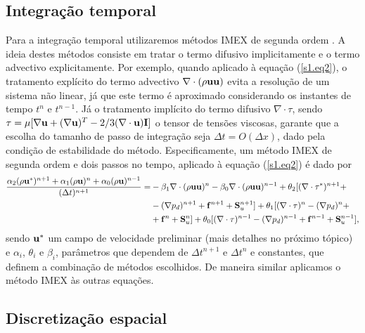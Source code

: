 \documentclass[12pt, brazil]{article}
\begin{document}
\subsection{Integração temporal}

Para a integração temporal utilizaremos métodos IMEX de segunda ordem \cite{ALV13,ASC95,CAL12,HUA19}. A ideia destes métodos consiste em tratar o termo difusivo implicitamente e o termo advectivo explicitamente. Por exemplo, quando aplicado à equação (\ref{s1.eq2}), o tratamento explícito do termo advectivo $\nabla\cdot(\rho {\bf u}{\bf u})$ evita a resolução de um sistema não linear, já que este termo é aproximado considerando os instantes de tempo $t^n$ e $t^{n-1}$. Já o tratamento implícito do termo difusivo $\nabla\cdot\tau$, sendo $\tau = \mu[\nabla{\bf u} + (\nabla{\bf u})^T - 2/3(\nabla\cdot{\bf u}){\bf I}]$ o tensor de tensões viscosas, garante que a escolha do tamanho de passo de integração seja $\Delta t = O(\Delta x)$, dado pela condição de estabilidade do método. Especificamente, um método IMEX de segunda ordem e dois passos no tempo, aplicado à equação (\ref{s1.eq2}) é dado por
\begin{equation}\label{s2.eq1}
\begin{split}
\dfrac{\alpha_2 (\rho {\bf u^*})^{n+1}+\alpha_1(\rho {\bf u})^n + \alpha_0(\rho {\bf u})^{n-1}}{(\Delta t)^{n+1}}  = &  - \beta_1\nabla\cdot(\rho{\bf u}{\bf u})^n - \beta_0\nabla\cdot(\rho{\bf u}{\bf u})^{n-1} + \theta_2[(\nabla\cdot\tau^*)^{n+1} + \\
  & - (\nabla p_d)^{n+1} + {\bf f}^{n+1} + {\bf S}_u^{n+1}] + \theta_1[(\nabla\cdot\tau)^{n} - (\nabla p_d)^n + \\
  & + {\bf f}^n + {\bf S}_u^n] + \theta_0[(\nabla\cdot\tau)^{n-1} - (\nabla p_d)^{n-1} + {\bf f}^{n-1} + {\bf S}_u^{n-1}],
\end{split}
\end{equation}
sendo ${\bf u^*}$ um campo de velocidade preliminar (mais detalhes no próximo tópico) e $\alpha_i$, $\theta_i$ e $\beta_i$, parâmetros que dependem de $\Delta t^{n+1}$ e $\Delta t^n$ e constantes, que definem a combinação de métodos escolhidos. De maneira similar aplicamos o método IMEX às outras equações.

\subsection{Discretização espacial}
\end{document}
